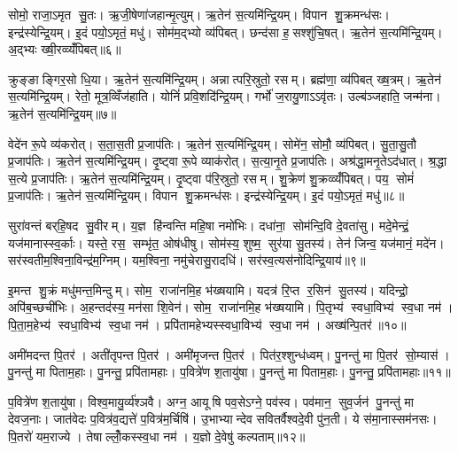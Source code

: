 सोमो॒ राजा॒ऽमृत सु॒तः। ऋ॒जी॒षेणा॑जहान्मृ॒त्युम्। ऋ॒तेन॑ स॒त्यमि॑न्द्रि॒यम्। विपान शु॒क्रमन्ध॑सः। इन्द्र॑स्येन्द्रि॒यम्। इ॒दं पयो॒ऽमृतं॒ मधु॑। सोम॑म॒द्भ्यो व्य॑पिबत्। छन्द॑सा ह॒सश्शु॑चि॒षत्। ऋ॒तेन॑ स॒त्यमि॑न्द्रि॒यम्। अ॒द्भ्यः ख्षी॒रव्व्यँ॑पिबत्॥६॥

क्रुङ्ङाङ्गिर॒सो धि॒या। ऋ॒तेन॑ स॒त्यमि॑न्द्रि॒यम्। अन्नात्परि॒स्रुतो॒ रसम्। ब्रह्म॑णा॒ व्य॑पिबत् ख्ष॒त्रम्। ऋ॒तेन॑ स॒त्यमि॑न्द्रि॒यम्। रेतो॒ मूत्र॒व्विँज॑हाति। योनिं॑ प्रवि॒शदि॑न्द्रि॒यम्। गर्भो॑ ज॒रायु॒णाऽऽवृ॑तः। उल्ब॑ञ्जहाति॒ जन्म॑ना। ऋ॒तेन॑ स॒त्यमि॑न्द्रि॒यम्॥७॥

वेदे॑न रू॒पे व्य॑करोत्। स॒ता॒स॒ती प्र॒जाप॑तिः। ऋ॒तेन॑ स॒त्यमि॑न्द्रि॒यम्। सोमे॑न॒ सोमौ॒ व्य॑पिबत्। सु॒ता॒सु॒तौ प्र॒जाप॑तिः। ऋ॒तेन॑ स॒त्यमि॑न्द्रि॒यम्। दृ॒ष्ट्वा रू॒पे व्याक॑रोत्। स॒त्या॒नृ॒ते प्र॒जाप॑तिः। अश्र॑द्धा॒मनृ॒तेऽद॑धात्। श्र॒द्धा स॒त्ये प्र॒जाप॑तिः। ऋ॒तेन॑ स॒त्यमि॑न्द्रि॒यम्। दृ॒ष्ट्वा प॑रि॒स्रुतो॒ रसम्। शु॒क्रेण॑ शु॒क्रव्व्यँ॑पिबत्। पय॒ सोमं॑ प्र॒जाप॑तिः। ऋ॒तेन॑ स॒त्यमि॑न्द्रि॒यम्। विपान शु॒क्रमन्ध॑सः। इन्द्र॑स्येन्द्रि॒यम्। इ॒दं पयो॒ऽमृतं॒ मधु॑॥८॥\anuvakamend[अ॒द्भ्यः ख्षी॒रव्व्यँ॑पिब॒ज्जन्म॑न॒र्तेन॑ स॒त्यमि॑न्द्रि॒य श्र॒द्धा स॒त्ये प्र॒जाप॑तिर॒ष्टौ च॑]

सुरा॑वन्तं बर्‌हि॒षद सु॒वीरम्। य॒ज्ञ हि॑न्वन्ति महि॒षा नमो॑भिः। दधा॑ना॒ सोम॑न्दि॒वि दे॒वता॑सु। मदे॒मेन्द्रं॒ यज॑मानास्स्व॒र्काः। यस्ते॒ रस॒ सम्भृ॑त॒ ओष॑धीषु। सोम॑स्य॒ शुष्म॒ सुर॑या सु॒तस्य॑। तेन॑ जिन्व॒ यज॑मानं॒ मदे॑न। सर॑स्वतीम॒श्विना॒विन्द्र॑म॒ग्निम्। यम॒श्विना॒ नमु॑चेरासु॒रादधि॑। सर॑स्व॒त्यस॑नोदिन्द्रि॒याय॑॥९॥

इ॒मन्त शु॒क्रं मधु॑मन्त॒मिन्दुम्। सोम॒ राजा॑नमि॒ह भ॑ख्षयामि। यदत्र॑ रि॒प्त र॒सिन॑ सु॒तस्य॑। यदिन्द्रो॒ अपि॑ब॒च्छची॑भिः। अ॒हन्तद॑स्य॒ मन॑सा शि॒वेन॑। सोम॒ राजा॑नमि॒ह भ॑ख्षयामि। पि॒तृभ्य॑ स्वधा॒विभ्य॑ स्व॒धा नम॑। पि॒ता॒म॒हेभ्य॑ स्वधा॒विभ्य॑ स्व॒धा नम॑। प्रपि॑तामहेभ्यस्स्वधा॒विभ्य॑ स्व॒धा नम॑। अख्ष॑न्पि॒तर॑॥१०॥

अमी॑मदन्त पि॒तर॑। अती॑तृपन्त पि॒तर॑। अमी॑मृजन्त पि॒तर॑। पित॑र॒श्शुन्ध॑ध्वम्। पु॒नन्तु॑ मा पि॒तर॑ सो॒म्यास॑। पु॒नन्तु॑ मा पिताम॒हाः। पु॒नन्तु॒ प्रपि॑तामहाः। प॒वित्रे॑ण श॒तायु॑षा। पु॒नन्तु॑ मा पिताम॒हाः। पु॒नन्तु॒ प्रपि॑तामहाः॥११॥

प॒वित्रे॑ण श॒तायु॑षा। विश्व॒मायु॒र्व्य॑श्ञवै। अग्न॒ आयूषि पव॒सेऽग्ने॒ पव॑स्व। पव॑मान॒ सुव॒र्जन॑ पु॒नन्तु॑ मा देवज॒नाः। जात॑वेदः प॒वित्र॑व॒द्यत्ते॑ प॒वित्र॑म॒र्चिषि॑। उ॒भाभ्यान्देव सवितर्वैश्वदे॒वी पु॑न॒ती। ये स॑मा॒नास्सम॑नसः। पि॒तरो॑ यम॒राज्ये। तेषाल्लोँ॒कस्स्व॒धा नम॑। य॒ज्ञो दे॒वेषु॑ कल्पताम्॥१२॥

